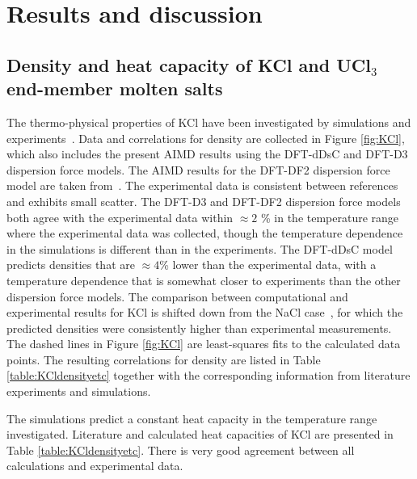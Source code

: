 \documentclass[preprint,3p,10pt,twocolumn,number,sort&compress]{elsarticle}
\begin{document}
\section{Results and discussion}
\label{sec:results}

\subsection{Density and heat capacity of KCl and UCl$_3$ end-member molten salts}
\label{sec:endmember}
The thermo-physical properties of KCl have been investigated by simulations and experiments~\cite{Janz1988,Artsdalen1955,Moon,DUEMMLER2022153414}. Data and correlations for density are collected in Figure \ref{fig:KCl}, which also includes the present AIMD results using the DFT-dDsC and DFT-D3 dispersion force models. 
The AIMD results for the DFT-DF2 dispersion force model are taken from~\cite{DUEMMLER2022153414}. The experimental data is consistent between references and exhibits small scatter. The DFT-D3 and DFT-DF2 dispersion force models both agree with the experimental data within $\approx 2$ \% in the temperature range where the experimental data was collected, though the temperature dependence in the simulations is different than in the experiments. The DFT-dDsC model predicts densities that are $\approx 4$\% lower than the experimental data, with a temperature dependence that is somewhat closer to experiments than the other dispersion force models. The comparison between computational and experimental results for KCl is shifted down from the NaCl case~\cite{Andersson}, for which the predicted densities were consistently higher than experimental measurements. The dashed lines in Figure \ref{fig:KCl} are least-squares fits to the calculated data points. The resulting correlations for density are listed in Table \ref{table:KCldensityetc} together with the corresponding information from literature experiments and simulations. 

The simulations predict a constant heat capacity in the temperature range investigated. Literature and calculated heat capacities of KCl are presented in Table \ref{table:KCldensityetc}. There is very good agreement between all calculations and experimental data. 
\end{document}
